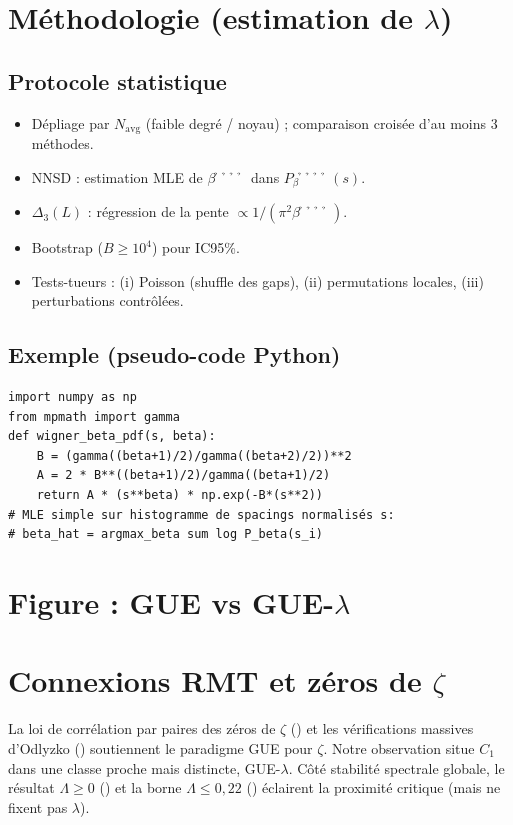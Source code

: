 \documentclass[11pt,a4paper]{article}
\def\lambda{λ}%
\def\Delta{Δ}%
\def\beta{β̉̉̉̉}%
\def\zeta{ζ}%
\def\textbf#1{#1}%
\def\emph#1{#1}%
\begin{document}
\section{Méthodologie (estimation de \texorpdfstring{$\lambda$}{lambda})}
\subsection*{Protocole statistique}
\begin{itemize}
  \item \textbf{Dépliage} par $N_{\text{avg}}$ (faible degré / noyau) ; comparaison croisée d’au moins 3 méthodes.
  \item \textbf{NNSD} : estimation MLE de $\beta$ dans $P_\beta(s)$.
  \item \textbf{$\Delta_3(L)$} : régression de la pente $\propto 1/(\pi^2\beta)$.
  \item \textbf{Bootstrap} ($B\ge 10^4$) pour IC95\%.
  \item \textbf{Tests-tueurs} : (i) Poisson (shuffle des gaps), (ii) permutations locales, (iii) perturbations contrôlées.
\end{itemize}

\subsection*{Exemple (pseudo-code Python)}
\begin{verbatim}
import numpy as np
from mpmath import gamma
def wigner_beta_pdf(s, beta):
    B = (gamma((beta+1)/2)/gamma((beta+2)/2))**2
    A = 2 * B**((beta+1)/2)/gamma((beta+1)/2)
    return A * (s**beta) * np.exp(-B*(s**2))
# MLE simple sur histogramme de spacings normalisés s:
# beta_hat = argmax_beta sum log P_beta(s_i)
\end{verbatim}

\section{Figure : GUE vs GUE-\texorpdfstring{$\lambda$}{lambda}}

\section{Connexions RMT et zéros de \texorpdfstring{$\zeta$}{zeta}}
La loi de corrélation par paires des zéros de $\zeta$ (\citealt{Montgomery1973}) et les vérifications massives d’Odlyzko (\citealt{Odlyzko1987}) soutiennent le paradigme GUE pour $\zeta$.
Notre observation situe $C_1$ dans une classe \emph{proche} mais distincte, GUE-$\lambda$.
Côté stabilité spectrale globale, le résultat $\Lambda\ge 0$ (\citealt{RodgersTao2018}) et la borne $\Lambda\le 0{,}22$ (\citealt{Polymath2019}) éclairent la \emph{proximité critique} (mais ne fixent pas $\lambda$).
\end{document}

